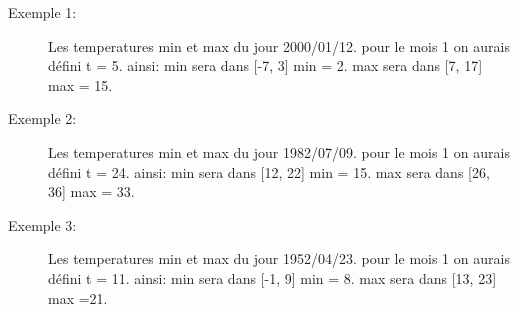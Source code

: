 \begin{description}
\item[Exemple 1:] Les temperatures min et max du jour 2000/01/12.
pour le mois 1 on aurais défini t = 5.
ainsi: min sera dans [-7, 3] min = 2.
       max sera dans [7, 17] max = 15.
 
\item[Exemple 2:] Les temperatures min et max du jour 1982/07/09.
pour le mois 1 on aurais défini t = 24.
ainsi: min sera dans [12, 22] min = 15.
       max sera dans [26, 36] max = 33.

\item[Exemple 3:] Les temperatures min et max du jour 1952/04/23.
pour le mois 1 on aurais défini t = 11.
ainsi: min sera dans [-1, 9] min = 8.
       max sera dans [13, 23] max =21.
\end{description}



         